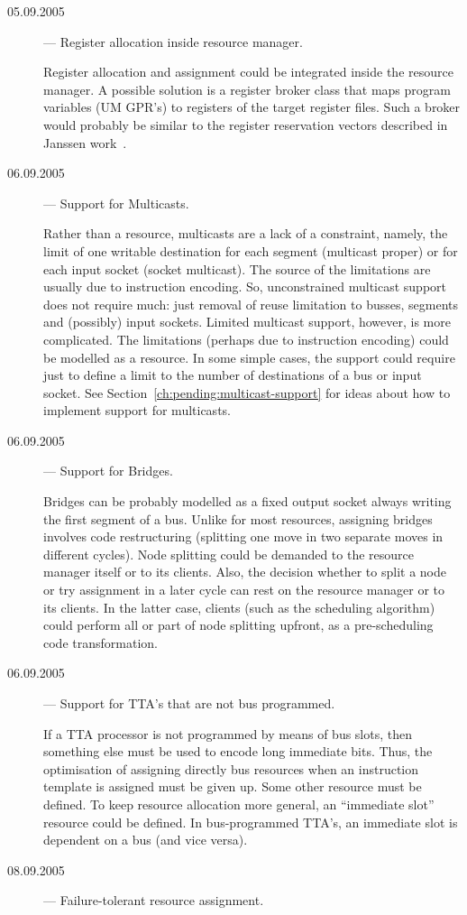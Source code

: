 \documentclass[a4paper,twoside]{tce}
\begin{document}
\begin{description}
\item[05.09.2005] --- Register allocation inside resource manager.

  Register allocation and assignment could be integrated inside the resource
  manager. A possible solution is a register broker class that maps program
  variables (UM GPR's) to registers of the target register files. Such a
  broker would probably be similar to the register reservation vectors
  described in Janssen work~\cite{JJans01}.

\item[06.09.2005] --- Support for Multicasts.

  Rather than a resource, multicasts are a lack of a constraint, namely, the
  limit of one writable destination for each segment (multicast proper) or
  for each input socket (socket multicast). The source of the limitations
  are usually due to instruction encoding. So, unconstrained multicast
  support does not require much: just removal of reuse limitation to busses,
  segments and (possibly) input sockets. Limited multicast support, however,
  is more complicated. The limitations (perhaps due to instruction encoding)
  could be modelled as a resource. In some simple cases, the support could
  require just to define a limit to the number of destinations of a bus or
  input socket. See Section~\ref{ch:pending:multicast-support} for ideas
  about how to implement support for multicasts.

\item[06.09.2005] --- Support for Bridges.

  Bridges can be probably modelled as a fixed output socket always writing
  the first segment of a bus. Unlike for most resources, assigning bridges
  involves code restructuring (splitting one move in two separate moves in
  different cycles). Node splitting could be demanded to the resource
  manager itself or to its clients. Also, the decision whether to split a
  node or try assignment in a later cycle can rest on the resource manager
  or to its clients. In the latter case, clients (such as the scheduling
  algorithm) could perform all or part of node splitting upfront, as a
  pre-scheduling code transformation.

\item[06.09.2005] --- Support for TTA's that are not bus programmed.

  If a TTA processor is not programmed by means of bus slots, then something
  else must be used to encode long immediate bits. Thus, the optimisation of
  assigning directly bus resources when an instruction template is assigned
  must be given up. Some other resource must be defined. To keep resource
  allocation more general, an ``immediate slot'' resource could be defined.
  In bus-programmed TTA's, an immediate slot is dependent on a bus (and vice
  versa).
\item[08.09.2005] --- Failure-tolerant resource assignment.


\end{description}
\end{document}
